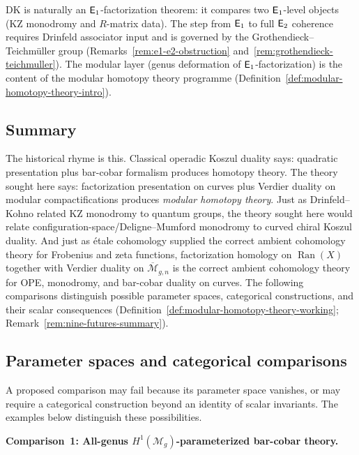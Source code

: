 \begin{remark}
DK is naturally an $\mathsf{E}_1$-factorization theorem: it compares two
$\mathsf{E}_1$-level objects (KZ monodromy and $R$-matrix data).  The step
from $\mathsf{E}_1$ to full $\mathsf{E}_2$ coherence requires Drinfeld associator
input and is governed by the Grothendieck--Teichm\"uller group
(Remarks~\ref{rem:e1-e2-obstruction}
and~\ref{rem:grothendieck-teichmuller}).  The modular layer (genus
deformation of $\mathsf{E}_1$-factorization) is the content of the modular
homotopy theory programme
(Definition~\ref{def:modular-homotopy-theory-intro}).
\end{remark}

\subsection{Summary}

The historical rhyme is this.  Classical operadic Koszul duality
says: quadratic presentation plus bar-cobar formalism produces
homotopy theory.  The theory sought here says: factorization
presentation on curves plus Verdier duality on modular
compactifications produces \emph{modular homotopy theory}.  Just as
Drinfeld--Kohno related KZ monodromy to quantum groups, the theory
sought here would relate configuration-space/Deligne--Mumford
monodromy to curved chiral Koszul duality.  And just as \'etale
cohomology supplied the correct ambient cohomology theory for
Frobenius and zeta functions, factorization homology on
$\operatorname{Ran}(X)$ together with Verdier duality on
$\overline{\mathcal{M}}_{g,n}$ is the correct ambient cohomology
theory for OPE, monodromy, and bar-cobar duality on curves.
The following comparisons distinguish possible parameter spaces,
categorical constructions, and their scalar consequences
(Definition~\ref{def:modular-homotopy-theory-working};
Remark~\ref{rem:nine-futures-summary}).

\subsection{Parameter spaces and categorical comparisons}\label{subsec:nine-futures}

A proposed comparison may fail because its parameter space vanishes, or may
require a categorical construction beyond an identity of scalar invariants.
The examples below distinguish these possibilities.

\medskip

\noindent\textbf{Comparison~1: All-genus $H^1(\mathcal{M}_g)$-parameterized
bar-cobar theory.}

